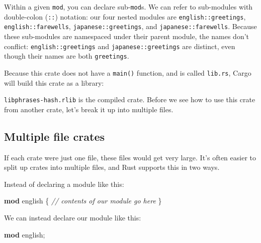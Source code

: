 \documentclass[a4paper,]{book}
\newenvironment{Shaded}{\begin{snugshade}}{\end{snugshade}}
\newcommand{\KeywordTok}[1]{\textcolor[rgb]{0.13,0.29,0.53}{\textbf{{#1}}}}
\newcommand{\CommentTok}[1]{\textcolor[rgb]{0.56,0.35,0.01}{\textit{{#1}}}}
\newcommand{\NormalTok}[1]{{#1}}
\begin{document}
Within a given \texttt{mod}, you can declare sub-\texttt{mod}s. We can
refer to sub-modules with double-colon (\texttt{::}) notation: our four
nested modules are \texttt{english::greetings},
\texttt{english::farewells}, \texttt{japanese::greetings}, and
\texttt{japanese::farewells}. Because these sub-modules are namespaced
under their parent module, the names don't conflict:
\texttt{english::greetings} and \texttt{japanese::greetings} are
distinct, even though their names are both \texttt{greetings}.

Because this crate does not have a \texttt{main()} function, and is
called \texttt{lib.rs}, Cargo will build this crate as a library:

\begin{Shaded}
\end{Shaded}

\texttt{libphrases-hash.rlib} is the compiled crate. Before we see how
to use this crate from another crate, let's break it up into multiple
files.

\subsection{Multiple file crates}\label{multiple-file-crates}

If each crate were just one file, these files would get very large. It's
often easier to split up crates into multiple files, and Rust supports
this in two ways.

Instead of declaring a module like this:

\begin{Shaded}
\begin{Highlighting}[]
\KeywordTok{mod} \NormalTok{english \{}
    \CommentTok{// contents of our module go here}
\NormalTok{\}}
\end{Highlighting}
\end{Shaded}

We can instead declare our module like this:

\begin{Shaded}
\begin{Highlighting}[]
\KeywordTok{mod} \NormalTok{english;}
\end{Highlighting}
\end{Shaded}
\end{document}
